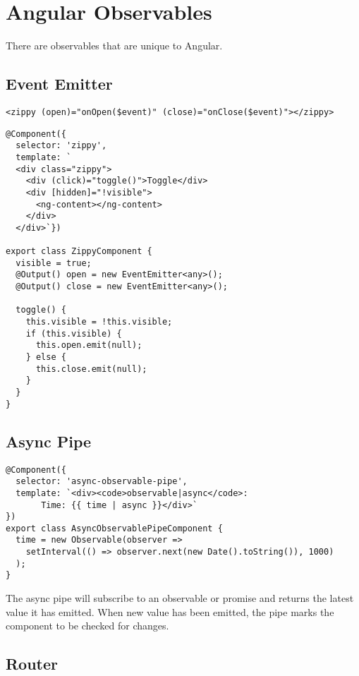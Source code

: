 \chapter{ Angular Observables }
There are observables that are unique to Angular.
\section{ Event Emitter }

\begin{lstlisting}
<zippy (open)="onOpen($event)" (close)="onClose($event)"></zippy>
\end{lstlisting}

\begin{lstlisting}
@Component({
  selector: 'zippy',
  template: `
  <div class="zippy">
    <div (click)="toggle()">Toggle</div>
    <div [hidden]="!visible">
      <ng-content></ng-content>
    </div>
  </div>`})

export class ZippyComponent {
  visible = true;
  @Output() open = new EventEmitter<any>();
  @Output() close = new EventEmitter<any>();

  toggle() {
    this.visible = !this.visible;
    if (this.visible) {
      this.open.emit(null);
    } else {
      this.close.emit(null);
    }
  }
}
\end{lstlisting}

\section{ Async Pipe }
\begin{lstlisting}
@Component({
  selector: 'async-observable-pipe',
  template: `<div><code>observable|async</code>:
       Time: {{ time | async }}</div>`
})
export class AsyncObservablePipeComponent {
  time = new Observable(observer =>
    setInterval(() => observer.next(new Date().toString()), 1000)
  );
}
\end{lstlisting}

The async pipe will subscribe to an observable or promise and returns the latest value it has emitted. When new value has been emitted, the pipe marks the component to be checked for changes. 

\section{ Router }
